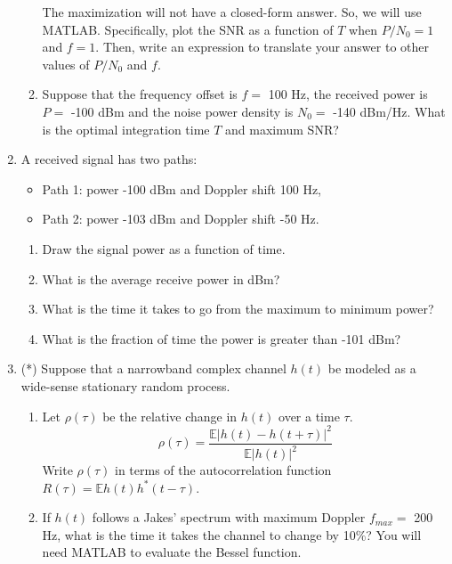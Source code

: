 \documentclass[11pt]{article}
\def\Exp{\mathbb{E}}
\begin{document}
\begin{enumerate}
\begin{enumerate}[label=(\alph*)]
The maximization will not have a closed-form answer.  So, we will use MATLAB.
Specifically, plot the SNR as a function of $T$ when $P/N_0=1$ and $f=1$.  Then,
write an expression to translate your answer to other values of $P/N_0$ and $f$.

\item Suppose that the frequency offset is $f=$ 100 Hz, the received power
is $P=$ -100 dBm and the noise power density is $N_0=$ -140 dBm/Hz.
What is the optimal integration time $T$ and maximum SNR?

\end{enumerate}

\item A received signal has two paths:
\begin{itemize}
\item Path 1:  power -100 dBm and Doppler shift 100 Hz,
\item Path 2:  power -103 dBm and Doppler shift -50 Hz.
\end{itemize}
\begin{enumerate}[label=(\alph*)]
\item Draw the signal power as a function of time.
\item What is the average receive power in dBm?
\item What is the time it takes to go from the maximum to minimum power?
\item What is the fraction of time the power is greater than -101 dBm?
\end{enumerate}

\item (*) Suppose that a narrowband complex channel $h(t)$ be modeled as
a wide-sense stationary random process.
\begin{enumerate}[label=(\alph*)]

\item Let $\rho(\tau)$ be the relative change
in $h(t)$ over a time $\tau$.
\[
    \rho(\tau) = \frac{\Exp|h(t)-h(t+\tau)|^2}{\Exp|h(t)|^2}
\]
Write $\rho(\tau)$ in terms of the autocorrelation function
$R(\tau) = \Exp h(t)h^*(t-\tau)$.

\item If $h(t)$ follows a Jakes' spectrum with maximum Doppler $f_{max} = $ 200 Hz,
what is the time it takes the channel to change by 10\%?
You will need MATLAB to evaluate the Bessel function.
\end{enumerate}


\end{enumerate}
\end{document}
